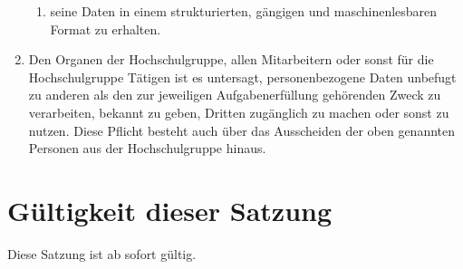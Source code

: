 \documentclass[11pt]{article}
\begin{document}
\begin{enumerate}
\begin{enumerate}
		      \item seine Daten in einem strukturierten, gängigen und maschinenlesbaren Format zu erhalten.
	      \end{enumerate}
	\item Den Organen der Hochschulgruppe, allen Mitarbeitern oder sonst für die Hochschulgruppe
	      Tätigen ist es untersagt, personenbezogene Daten unbefugt zu anderen als den zur jeweiligen
	      Aufgabenerfüllung gehörenden Zweck zu verarbeiten, bekannt zu geben, Dritten zugänglich zu
	      machen oder sonst zu nutzen. Diese Pflicht besteht auch über das Ausscheiden der oben
	      genannten Personen aus der Hochschulgruppe hinaus.
\end{enumerate}
\section{Gültigkeit dieser Satzung}
Diese Satzung ist ab sofort gültig.
\end{document}
